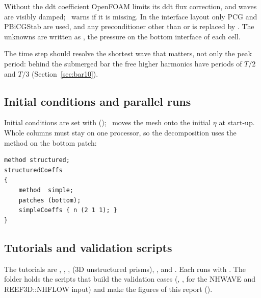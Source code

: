 Without the ddt coefficient OpenFOAM limits its ddt flux correction, and waves
are visibly damped; \NHFOAM\ warns if it is missing. In the interface layout
only PCG and PBiCGStab are used, and any preconditioner other than
 or  is replaced by . The unknowns
are written as , the pressure on the bottom interface of each cell.

The time step should resolve the shortest wave that matters, not only the
peak period: behind the submerged bar the free higher harmonics have periods
of $T/2$ and $T/3$ (Section~\ref{sec:bar10}).

\subsection{Initial conditions and parallel runs}

Initial conditions are set with 
(); \NHFOAM\ moves the mesh onto the initial
$\eta$ at start-up. Whole columns must stay on one processor, so the
decomposition uses the  method on the bottom patch:
\begin{verbatim}
method structured;
structuredCoeffs
{
    method  simple;
    patches (bottom);
    simpleCoeffs { n (2 1 1); }
}
\end{verbatim}

\subsection{Tutorials and validation scripts}

The tutorials are , ,
,  (3D unstructured prisms),
,  and . Each runs with
. The folder  holds the scripts that build the
validation cases (, ,
 for the NHWAVE and REEF3D::NHFLOW input) and make the
figures of this report ().
